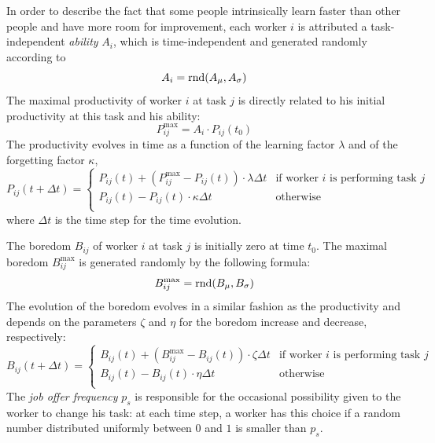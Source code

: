 In order to describe the fact that some people intrinsically learn faster than other people and have more room for improvement, each worker $i$ is attributed a task-independent \emph{ability} $A_i$, which is time-independent and generated randomly according to
\begin{equation}
	A_{i} = \mathrm{rnd}(A_\mu,A_\sigma)
\end{equation}
The maximal productivity of worker $i$ at task $j$ is directly related to his initial productivity at this task and his ability:
\begin{equation}
	P_{ij}^\textrm{max} = A_i \cdot P_{ij}(t_0)
\end{equation}
The productivity evolves in time as a function of the learning factor $\lambda$ and of the forgetting factor $\kappa$, 
\begin{equation}
	P_{ij}(t+\Delta t) = \begin{cases}
		P_{ij}(t) + (P_{ij}^\textrm{max}-P_{ij}(t)) \cdot \lambda \Delta t & \text{if worker $i$ is performing task $j$}\\
		P_{ij}(t) - P_{ij}(t) \cdot \kappa \Delta t & \text{otherwise}\\
		\end{cases}
\end{equation}
where $\Delta t$ is the time step for the time evolution.

The boredom $B_{ij}$ of worker $i$ at task $j$ is initially zero at time $t_0$. The maximal boredom $B_{ij}^\textrm{max}$ is generated randomly by the following formula:
\begin{equation}
	B_{ij}^\textrm{max} = \mathrm{rnd}(B_\mu,B_\sigma)
\end{equation}
The evolution of the boredom evolves in a similar fashion as the productivity and depends on the parameters $\zeta$ and $\eta$ for the boredom increase and decrease, respectively:
\begin{equation}
	B_{ij}(t+\Delta t) = \begin{cases}
		B_{ij}(t) + (B_{ij}^\textrm{max}-B_{ij}(t)) \cdot \zeta \Delta t & \text{if worker $i$ is performing task $j$}\\
		B_{ij}(t) - B_{ij}(t) \cdot \eta \Delta t & \text{otherwise}\\
		\end{cases}
\end{equation}
The \emph{job offer frequency} $p_s$ is responsible for the occasional possibility given to the worker to change his task: at each time step, a worker has this choice if a random number distributed uniformly between $0$ and $1$ is smaller than $p_s$.

